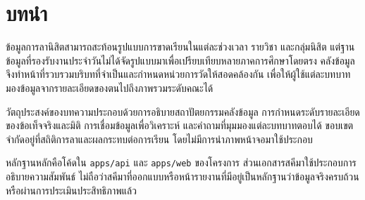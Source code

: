 \section{บทนำ}
ข้อมูลการลานิสิตสามารถสะท้อนรูปแบบการขาดเรียนในแต่ละช่วงเวลา รายวิชา และกลุ่มนิสิต แต่ฐานข้อมูลที่รองรับงานประจำวันไม่ได้จัดรูปแบบมาเพื่อเปรียบเทียบหลายภาคการศึกษาโดยตรง คลังข้อมูลจึงทำหน้าที่รวบรวมบริบทที่จำเป็นและกำหนดหน่วยการวัดให้สอดคล้องกัน เพื่อให้ผู้ใช้แต่ละบทบาทมองข้อมูลจากรายละเอียดของตนไปถึงภาพรวมระดับคณะได้\cite{repo,warehouse}

วัตถุประสงค์ของบทความประกอบด้วยการอธิบายสถาปัตยกรรมคลังข้อมูล การกำหนดระดับรายละเอียดของข้อเท็จจริงและมิติ การเชื่อมข้อมูลเพื่อวิเคราะห์ และคำถามที่มุมมองแต่ละบทบาทตอบได้ ขอบเขตจำกัดอยู่ที่สถิติการลาและผลกระทบต่อการเรียน โดยไม่มีการนำภาพหน้าจอมาใช้ประกอบ

หลักฐานหลักคือโค้ดใน \nolinkurl{apps/api} และ \nolinkurl{apps/web} ของโครงการ ส่วนเอกสารสคีมาใช้ประกอบการอธิบายความสัมพันธ์ ไม่ถือว่าสคีมาที่ออกแบบหรือหน้ารายงานที่มีอยู่เป็นหลักฐานว่าข้อมูลจริงครบถ้วนหรือผ่านการประเมินประสิทธิภาพแล้ว
